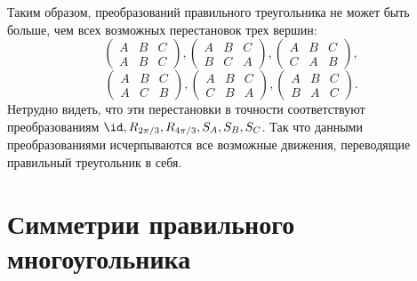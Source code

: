 \begin{enumerate}
Таким образом, преобразований правильного треугольника не может быть больше, чем всех возможных перестановок трех вершин:
$$
\begin{pmatrix}
A & B & C \\
A & B & C
\end{pmatrix},
\begin{pmatrix}
A & B & C \\
B & C & A
\end{pmatrix},
\begin{pmatrix}
A & B & C \\
C & A & B
\end{pmatrix},
$$
$$
\begin{pmatrix}
A & B & C \\
A & C & B
\end{pmatrix},
\begin{pmatrix}
A & B & C \\
C & B & A
\end{pmatrix},
\begin{pmatrix}
A & B & C \\
B & A & C
\end{pmatrix}.
$$
Нетрудно видеть, что эти перестановки в точности соответствуют преобразованиям $\id, R_{2\pi/3}, R_{4\pi/3}, S_A, S_B, S_C$. Так что данными преобразованиями исчерпываются все возможные движения, переводящие правильный треугольник в себя.
\end{enumerate}



\section{Симметрии правильного многоугольника}




